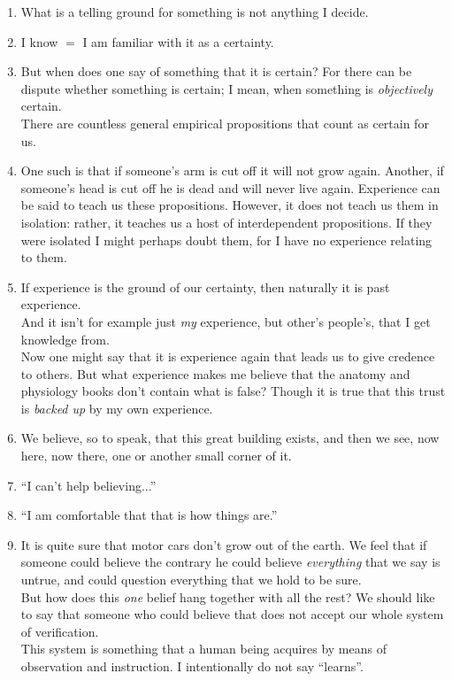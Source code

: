 \documentclass{book}
\begin{document}
\begin{enumerate}
\item
What is a telling ground for something is not anything I decide.

\item
I know $=$ I am familiar with it as a certainty.

\item
But when does one say of something that it is certain?  For there can be
dispute whether something is certain; I mean, when something is
\emph{objectively} certain. \\
There are countless general empirical propositions that count as certain for
us.

\item
One such is that if someone's arm is cut off it will not grow again. Another,
if someone's head is cut off he is dead and will never live again.  Experience
can be said to teach us these propositions. However, it does not teach us them
in isolation: rather, it teaches us a host of interdependent propositions. If
they were isolated I might perhaps doubt them, for I have no experience
relating to them.

\item
If experience is the ground of our certainty, then naturally it is past
experience. \\
And it isn't for example just \emph{my} experience, but other's people's, that
I get knowledge from. \\
Now one might say that it is experience again that leads us to give credence to
others. But what experience makes me believe that the anatomy and physiology
books don't contain what is false? Though it is true that this trust is
\emph{backed up} by my own experience.

\item
We believe, so to speak, that this great building exists, and then we see, now
here, now there, one or another small corner of it.

\item
``I can't help believing...''

\item
``I am comfortable that that is how things are.''

\item
It is quite sure that motor cars don't grow out of the earth. We feel that if
someone could believe the contrary he could believe \emph{everything} that we
say is untrue, and could question everything that we hold to be sure. \\
But how does this \emph{one} belief hang together with all the rest? We should
like to say that someone who could believe that does not accept our whole
system of verification. \\
This system is something that a human being acquires by means of observation
and instruction. I intentionally do not say ``learns''.


\end{enumerate}
\end{document}
